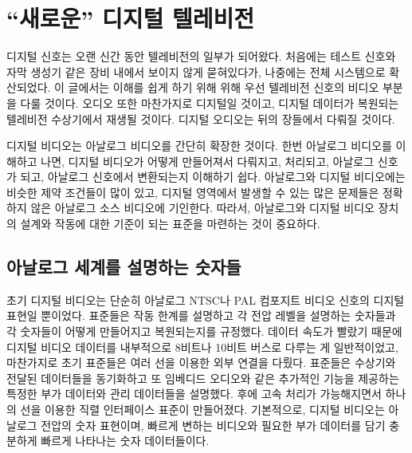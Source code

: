 \chapter{``새로운'' 디지털 텔레비전}
디지털 신호는 오랜 신간 동안 텔레비전의 일부가 되어왔다. 처음에는 테스트 신호와 자막 생성기 같은 장비 내에서 보이지 않게 묻혀있다가, 나중에는 전체 시스템으로 확산되었다.
이 글에서는 이해를 쉽게 하기 위해 위해 우선 텔레비전 신호의 비디오 부분을 다룰 것이다.
오디오 또한 마찬가지로 디지털일 것이고, 디지털 데이터가 복원되는 텔레비전 수상기에서 재생될 것이다. 디지털 오디오는 뒤의 장들에서 다뤄질 것이다.

디지털 비디오는 아날로그 비디오를 간단히 확장한 것이다. 한번 아날로그 비디오를 이해하고 나면, 디지털 비디오가 어떻게 만들어져서 다뤄지고, 처리되고, 아날로그 신호가 되고, 아날로그 신호에서 변환되는지 이해하기 쉽다.
아날로그와 디지털 비디오에는 비슷한 제약 조건들이 많이 있고, 디지털 영역에서 발생할 수 있는 많은 문제들은 정확하지 않은 아날로그 소스 비디오에 기인한다.
따라서, 아날로그와 디지털 비디오 장치의 설계와 작동에 대한 기준이 되는 표준을 마련하는 것이 중요하다.

\section{아날로그 세계를 설명하는 숫자들}
초기 디지털 비디오는 단순히 아날로그 NTSC나 PAL 컴포지트 비디오 신호의 디지털 표현일 뿐이었다.
표준들은 작동 한계를 설명하고 각 전압 레벨을 설명하는 숫자들과 각 숫자들이 어떻게 만들어지고 복원되는지를 규정했다.
데이터 속도가 빨랐기 때문에 디지털 비디오 데이터를 내부적으로 8비트나 10비트 버스로 다루는 게 일반적이었고, 마찬가지로 초기 표준들은 여러 선을 이용한 외부 연결을 다뤘다.
표준들은 수상기와 전달된 데이터들을 동기화하고 또 임베디드 오디오와 같은 추가적인 기능을 제공하는 특정한 부가 데이터와 관리 데이터들을 설명했다.
후에 고속 처리가 가능해지면서 하나의 선을 이용한 직렬 인터페이스 표준이 만들어졌다.
기본적으로, 디지털 비디오는 아날로그 전압의 숫자 표현이며, 빠르게 변하는 비디오와 필요한 부가 데이터를 담기 충분하게 빠르게 나타나는 숫자 데이터들이다.

